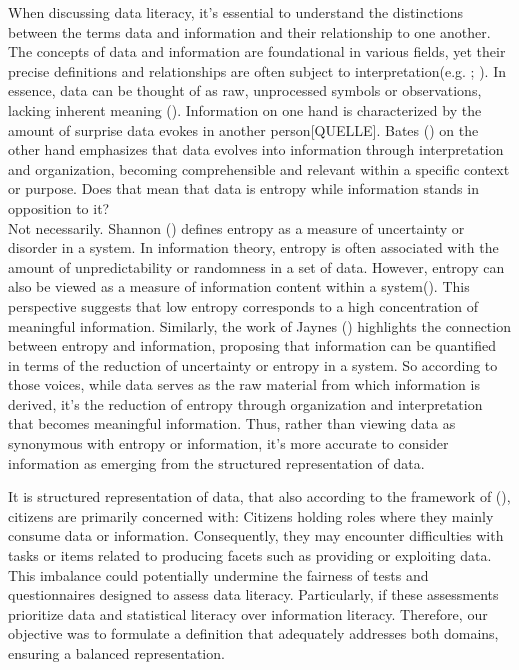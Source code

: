 \documentclass[
  12pt,
  a4paper,
  twoside]{article}
\begin{document}
When discussing data literacy, it's essential to understand the distinctions between the terms data and information and their relationship to one another.
The concepts of data and information are foundational in various fields, yet their precise definitions and relationships are often subject to interpretation(e.g. ; ). In essence, data can be thought of as raw, unprocessed symbols or observations, lacking inherent meaning (). Information on one hand is characterized by the amount of surprise data evokes in another person{[}QUELLE{]}. Bates () on the other hand emphasizes that data evolves into information through interpretation and organization, becoming comprehensible and relevant within a specific context or purpose. Does that mean that data is entropy while information stands in opposition to it?\\
Not necessarily. Shannon () defines entropy as a measure of uncertainty or disorder in a system. In information theory, entropy is often associated with the amount of unpredictability or randomness in a set of data. However, entropy can also be viewed as a measure of information content within a system(). This perspective suggests that low entropy corresponds to a high concentration of meaningful information. Similarly, the work of Jaynes () highlights the connection between entropy and information, proposing that information can be quantified in terms of the reduction of uncertainty or entropy in a system.
So according to those voices, while data serves as the raw material from which information is derived, it's the reduction of entropy through organization and interpretation that becomes meaningful information. Thus, rather than viewing data as synonymous with entropy or information, it's more accurate to consider information as emerging from the structured representation of data.

It is structured representation of data, that also according to the framework of (), citizens are primarily concerned with: Citizens holding roles where they mainly consume data or information. Consequently, they may encounter difficulties with tasks or items related to producing facets such as providing or exploiting data. This imbalance could potentially undermine the fairness of tests and questionnaires designed to assess data literacy. Particularly, if these assessments prioritize data and statistical literacy over information literacy. Therefore, our objective was to formulate a definition that adequately addresses both domains, ensuring a balanced representation.
\end{document}
